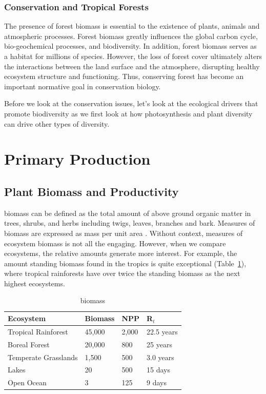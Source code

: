 \subsubsection{Conservation and Tropical Forests}

The presence of forest biomass is essential to the existence of plants, animals and atmospheric processes. Forest biomass greatly influences the global carbon cycle, bio-geochemical processes, and biodiversity.  In addition, forest biomass serves as a habitat for millions of species. However, the loss of forest cover ultimately alters the interactions between the land surface and the atmosphere, disrupting healthy ecosystem structure and functioning. Thus, conserving forest has become an important normative goal in conservation biology.

Before we look at the conservation issues, let's look at the ecological drivers that promote biodiversity as we first look at how photosynthesis and plant diversity can drive other types of diversity. 

\section{Primary Production}

\subsection{Plant Biomass and Productivity}

	
\Gls{biomass} can be defined as the total amount of above ground organic matter in trees, shrubs, and herbs including twigs, leaves, branches and bark. Measures of biomass are expressed as mass per unit area \citep{brown1991biomass}. Without context, measures of ecosystem biomass is not all the engaging. However, when we compare ecosystems, the relative amounts generate more interest. For example, the amount standing biomass found in the tropics is quite exceptional (Table~\ref{tab:biomass}), where tropical rainforests have over twice the standing biomass as the next highest ecosystems. 

\begin{table}[htb]
\centering
		\begin{tabular}{llll}\hline
Ecosystem 						& Biomass	& NPP		& R$_t$ \\ \hline\hline

Tropical Rainforest		& 45,000	& 2,000	& 22.5 years \\
Boreal Forest					& 20,000	& 800		& 25 years \\
Temperate Grasslands	& 1,500		& 500		& 3.0 years \\
Lakes									& 20			& 500		& 15 days\\
Open Ocean						& 3				& 125		& 9 days \\ \hline	
		\end{tabular}
	\caption{biomass}
	\label{tab:biomass}
\end{table}
	
